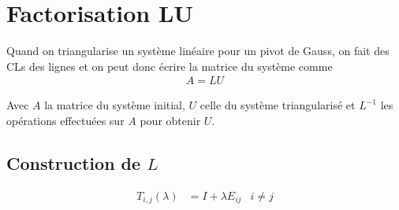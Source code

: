 \documentclass{article}
\begin{document}
\section{Factorisation LU}

Quand on triangularise un système linéaire pour un pivot de Gauss, on fait des CLs des lignes et on peut donc écrire la matrice du système comme
\begin{align*}
    A = LU
\end{align*}

Avec $A$ la matrice du système initial, $U$ celle du système triangularisé et $L^{-1}$ les opérations effectuées sur $A$ pour obtenir $U$.

\subsection{Construction de $L$}

\begin{definition}
    \begin{align*}
        T_{i, j}(\lambda) &= I + \lambda E_{ij} &i \neq j
    \end{align*}
\end{definition}
\end{document}
